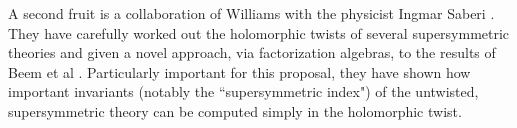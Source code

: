 \documentclass[11pt]{amsart}
\begin{document}
A second fruit is a collaboration of Williams with the physicist Ingmar Saberi \cite{SabWil1,SabWil2}.
They have carefully worked out the holomorphic twists of several supersymmetric theories
and given a novel approach, via factorization algebras, to the results of Beem et al \cite{Beem}.
Particularly important for this proposal,
they have shown how important invariants (notably the ``supersymmetric index") of the untwisted, supersymmetric theory can be computed simply in the holomorphic twist.
\end{document}
